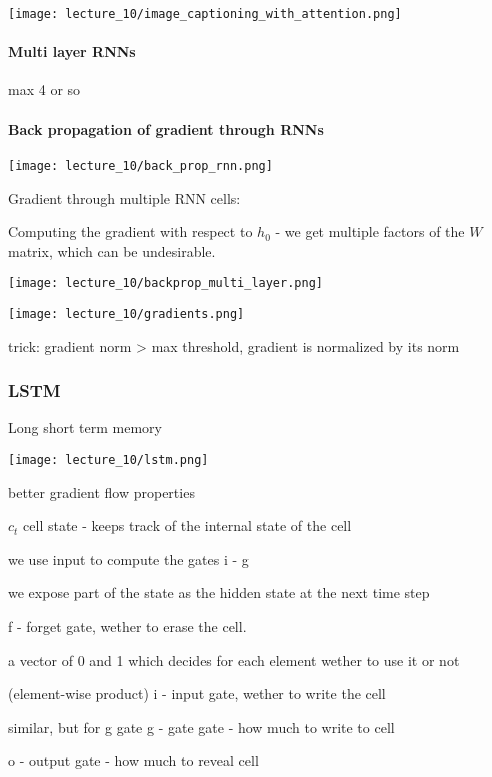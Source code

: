 \texttt{[image: lecture\_10/image\_captioning\_with\_attention.png]}

\paragraph{Multi layer RNNs}

max 4 or so

\paragraph{Back propagation of gradient through RNNs}

\texttt{[image: lecture\_10/back\_prop\_rnn.png]}

Gradient through multiple RNN cells: 

Computing the gradient with respect to $h_0$ - we get multiple factors of the $W$ matrix, which can be undesirable. 

\texttt{[image: lecture\_10/backprop\_multi\_layer.png]}

\texttt{[image: lecture\_10/gradients.png]}

trick: gradient norm > max threshold, gradient is normalized by its norm

\subsubsection{LSTM}

Long short term memory

\texttt{[image: lecture\_10/lstm.png]}

better gradient flow properties

$c_t$ cell state - keeps track of the internal state of the cell

we use input to compute the gates i - g

we expose part of the state as the hidden state at the next time step

f - forget gate, wether to erase the cell.

a vector of 0 and 1 which decides for each element wether to use it or not

(element-wise product)
i - input gate, wether to write the cell

similar, but for g gate
g - gate gate - how much to write to cell

o - output gate - how much to reveal cell

